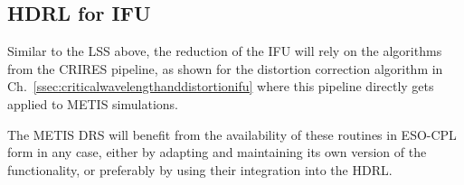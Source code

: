 \subsection{HDRL for IFU}
\label{ssec:hdrllms}

Similar to the LSS above, the reduction of the IFU will rely on the algorithms
from the \ac{CRIRES} pipeline, as shown for the distortion correction algorithm
in Ch.~\ref{ssec:criticalwavelengthanddistortionifu} where this pipeline
directly gets applied to METIS simulations.

The METIS DRS will benefit from the availability of these routines in ESO-CPL
form in any case, either by adapting and maintaining its own version of the
functionality, or preferably by using their integration into the HDRL. 